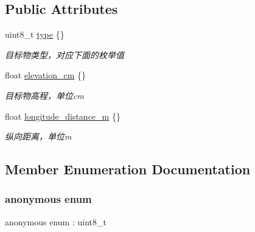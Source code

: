 \subsection*{Public Attributes}
\begin{DoxyCompactItemize}
\item 
uint8\+\_\+t \hyperlink{structmaf__perception__interface_1_1MagicCarpetObject_a681e948fef9f9c0b322daedcc12e89ca}{type} \{\}
\begin{DoxyCompactList}\small\item\em 目标物类型，对应下面的枚举值 \end{DoxyCompactList}\item 
float \hyperlink{structmaf__perception__interface_1_1MagicCarpetObject_a082d73e113d2a0a86f4d2bfb31e86d5f}{elevation\+\_\+cm} \{\}
\begin{DoxyCompactList}\small\item\em 目标物高程，单位cm \end{DoxyCompactList}\item 
float \hyperlink{structmaf__perception__interface_1_1MagicCarpetObject_a450084432b908dc8d18f915f95697e47}{longitude\+\_\+distance\+\_\+m} \{\}
\begin{DoxyCompactList}\small\item\em 纵向距离，单位m \end{DoxyCompactList}\end{DoxyCompactItemize}


\subsection{Member Enumeration Documentation}
\mbox{\label{structmaf__perception__interface_1_1MagicCarpetObject_a9c4c8d0efb3a8310d0013583949740ac}} 
\subsubsection{\texorpdfstring{anonymous enum}{anonymous enum}}
{\footnotesize\ttfamily anonymous enum \+: uint8\+\_\+t}

